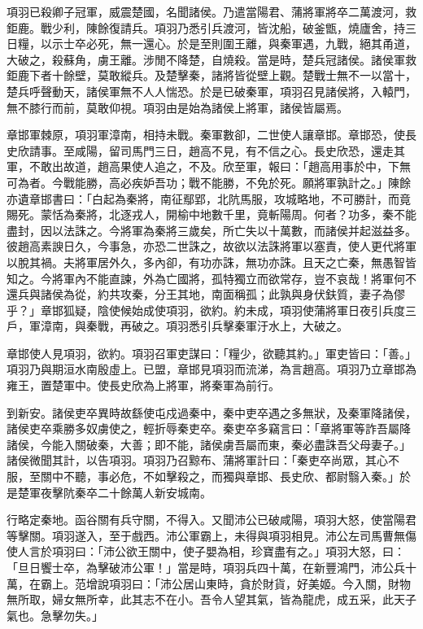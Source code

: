 \begin{pinyinscope}
項羽已殺卿子冠軍，威震楚國，名聞諸侯。乃遣當陽君、蒲將軍將卒二萬渡河，救鉅鹿。戰少利，陳餘復請兵。項羽乃悉引兵渡河，皆沈船，破釜甑，燒廬舍，持三日糧，以示士卒必死，無一還心。於是至則圍王離，與秦軍遇，九戰，絕其甬道，大破之，殺蘇角，虜王離。涉閒不降楚，自燒殺。當是時，楚兵冠諸侯。諸侯軍救鉅鹿下者十餘壁，莫敢縱兵。及楚擊秦，諸將皆從壁上觀。楚戰士無不一以當十，楚兵呼聲動天，諸侯軍無不人人惴恐。於是已破秦軍，項羽召見諸侯將，入轅門，無不膝行而前，莫敢仰視。項羽由是始為諸侯上將軍，諸侯皆屬焉。

章邯軍棘原，項羽軍漳南，相持未戰。秦軍數卻，二世使人讓章邯。章邯恐，使長史欣請事。至咸陽，留司馬門三日，趙高不見，有不信之心。長史欣恐，還走其軍，不敢出故道，趙高果使人追之，不及。欣至軍，報曰：「趙高用事於中，下無可為者。今戰能勝，高必疾妒吾功；戰不能勝，不免於死。願將軍孰計之。」陳餘亦遺章邯書曰：「白起為秦將，南征鄢郢，北阬馬服，攻城略地，不可勝計，而竟賜死。蒙恬為秦將，北逐戎人，開榆中地數千里，竟斬陽周。何者？功多，秦不能盡封，因以法誅之。今將軍為秦將三歲矣，所亡失以十萬數，而諸侯并起滋益多。彼趙高素諛日久，今事急，亦恐二世誅之，故欲以法誅將軍以塞責，使人更代將軍以脫其禍。夫將軍居外久，多內卻，有功亦誅，無功亦誅。且天之亡秦，無愚智皆知之。今將軍內不能直諫，外為亡國將，孤特獨立而欲常存，豈不哀哉！將軍何不還兵與諸侯為從，約共攻秦，分王其地，南面稱孤；此孰與身伏鈇質，妻子為僇乎？」章邯狐疑，陰使候始成使項羽，欲約。約未成，項羽使蒲將軍日夜引兵度三戶，軍漳南，與秦戰，再破之。項羽悉引兵擊秦軍汙水上，大破之。

章邯使人見項羽，欲約。項羽召軍吏謀曰：「糧少，欲聽其約。」軍吏皆曰：「善。」項羽乃與期洹水南殷虛上。已盟，章邯見項羽而流涕，為言趙高。項羽乃立章邯為雍王，置楚軍中。使長史欣為上將軍，將秦軍為前行。

到新安。諸侯吏卒異時故繇使屯戍過秦中，秦中吏卒遇之多無狀，及秦軍降諸侯，諸侯吏卒乘勝多奴虜使之，輕折辱秦吏卒。秦吏卒多竊言曰：「章將軍等詐吾屬降諸侯，今能入關破秦，大善；即不能，諸侯虜吾屬而東，秦必盡誅吾父母妻子。」諸侯微聞其計，以告項羽。項羽乃召黥布、蒲將軍計曰：「秦吏卒尚眾，其心不服，至關中不聽，事必危，不如擊殺之，而獨與章邯、長史欣、都尉翳入秦。」於是楚軍夜擊阬秦卒二十餘萬人新安城南。

行略定秦地。函谷關有兵守關，不得入。又聞沛公已破咸陽，項羽大怒，使當陽君等擊關。項羽遂入，至于戲西。沛公軍霸上，未得與項羽相見。沛公左司馬曹無傷使人言於項羽曰：「沛公欲王關中，使子嬰為相，珍寶盡有之。」項羽大怒，曰：「旦日饗士卒，為擊破沛公軍！」當是時，項羽兵四十萬，在新豐鴻門，沛公兵十萬，在霸上。范增說項羽曰：「沛公居山東時，貪於財貨，好美姬。今入關，財物無所取，婦女無所幸，此其志不在小。吾令人望其氣，皆為龍虎，成五采，此天子氣也。急擊勿失。」


\end{pinyinscope}
